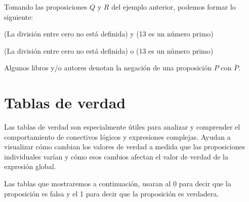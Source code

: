 \begin{myexample}
    Tomando las proposiciones $Q$ y $R$ del ejemplo anterior, podemos formar lo siguiente:
    \begin{center}
        (La división entre cero no está definida) \textcolor{jblueleft}{y} (13 es un número primo)

        (La división entre cero no está definida) \textcolor{jblueleft}{o} (13 es un número primo)
    \end{center}
\end{myexample}

\begin{importante}
    Algunos libros y/o autores denotan la negación de una proposición $P$ con $\overline{P}$.
\end{importante}


\section{Tablas de verdad}

Las tablas de verdad son especialmente útiles para analizar y comprender el comportamiento de conectivos lógicos y expresiones complejas. Ayudan a visualizar cómo cambian los valores de verdad a medida que las proposiciones individuales varían y cómo esos cambios afectan el valor de verdad de la expresión global.

Las tablas que mostraremos a continuación, usaran al 0 para decir que la proposición es falsa y el 1 para decir que la proposición es verdadera.

